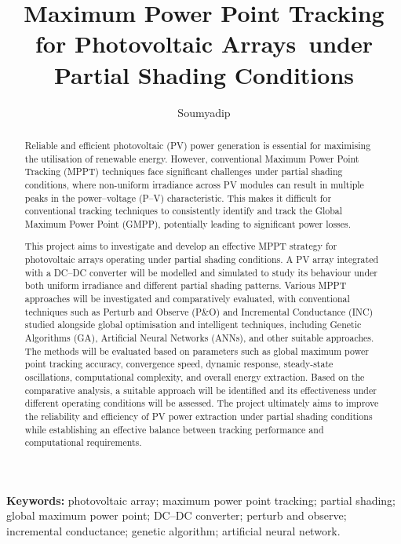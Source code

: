 \documentclass[12pt,a4paper]{article}
\title{Maximum Power Point Tracking for Photovoltaic Arrays\
under Partial Shading Conditions}
\author{Soumyadip}
\date{}
\newcommand{\PV}{PV}          %
\newcommand{\PVchar}{P--V}    %
\begin{document}
\maketitle

\begin{abstract}
\onehalfspacing
\noindent
Reliable and efficient photovoltaic (\PV) power generation is essential for
maximising the utilisation of renewable energy. However, conventional Maximum
Power Point Tracking (MPPT) techniques face significant challenges under
partial shading conditions, where non-uniform irradiance across \PV{} modules
can result in multiple peaks in the power--voltage (\PVchar) characteristic.
This makes it difficult for conventional tracking techniques to consistently
identify and track the Global Maximum Power Point (GMPP), potentially leading
to significant power losses.

This project aims to investigate and develop an effective MPPT strategy for
photovoltaic arrays operating under partial shading conditions. A \PV{} array
integrated with a DC--DC converter will be modelled and simulated to study its
behaviour under both uniform irradiance and different partial shading patterns.
Various MPPT approaches will be investigated and comparatively evaluated, with
conventional techniques such as Perturb and Observe (P\&O) and Incremental
Conductance (INC) studied alongside global optimisation and intelligent
techniques, including Genetic Algorithms (GA), Artificial Neural Networks
(ANNs), and other suitable approaches. The methods will be evaluated based on
parameters such as global maximum power point tracking accuracy, convergence
speed, dynamic response, steady-state oscillations, computational complexity,
and overall energy extraction. Based on the comparative analysis, a suitable
approach will be identified and its effectiveness under different operating
conditions will be assessed. The project ultimately aims to improve the
reliability and efficiency of \PV{} power extraction under partial shading
conditions while establishing an effective balance between tracking performance
and computational requirements.
\end{abstract}

\vspace{1em}
\noindent\textbf{Keywords:} photovoltaic array; maximum power point tracking;
partial shading; global maximum power point; DC--DC converter; perturb and
observe; incremental conductance; genetic algorithm; artificial neural network.
\end{document}
